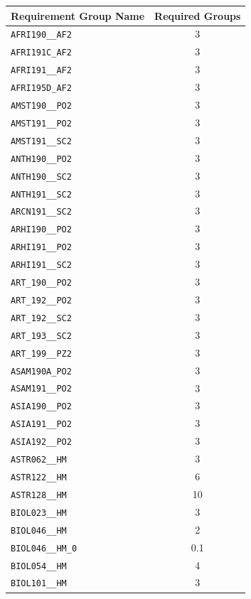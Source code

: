 \begin{longtable}{|p{}|c|}
    \hline
    Requirement Group Name & Required Groups\\\hline
    \verb|AFRI190__AF2| & 3\\\hline
    \verb|AFRI191C_AF2| & 3\\\hline
    \verb|AFRI191__AF2| & 3\\\hline
    \verb|AFRI195D_AF2| & 3\\\hline
    \verb|AMST190__PO2| & 3\\\hline
    \verb|AMST191__PO2| & 3\\\hline
    \verb|AMST191__SC2| & 3\\\hline
    \verb|ANTH190__PO2| & 3\\\hline
    \verb|ANTH190__SC2| & 3\\\hline
    \verb|ANTH191__SC2| & 3\\\hline
    \verb|ARCN191__SC2| & 3\\\hline
    \verb|ARHI190__PO2| & 3\\\hline
    \verb|ARHI191__PO2| & 3\\\hline
    \verb|ARHI191__SC2| & 3\\\hline
    \verb|ART_190__PO2| & 3\\\hline
    \verb|ART_192__PO2| & 3\\\hline
    \verb|ART_192__SC2| & 3\\\hline
    \verb|ART_193__SC2| & 3\\\hline
    \verb|ART_199__PZ2| & 3\\\hline
    \verb|ASAM190A_PO2| & 3\\\hline
    \verb|ASAM191__PO2| & 3\\\hline
    \verb|ASIA190__PO2| & 3\\\hline
    \verb|ASIA191__PO2| & 3\\\hline
    \verb|ASIA192__PO2| & 3\\\hline
    \verb|ASTR062__HM| & 3\\\hline
    \verb|ASTR122__HM| & 6\\\hline
    \verb|ASTR128__HM| & 10\\\hline
    \verb|BIOL023__HM| & 3\\\hline
    \verb|BIOL046__HM| & 2\\\hline
    \verb|BIOL046__HM_0| & 0.1\\\hline
    \verb|BIOL054__HM| & 4\\\hline
    \verb|BIOL101__HM| & 3\\\hline

\end{longtable}
